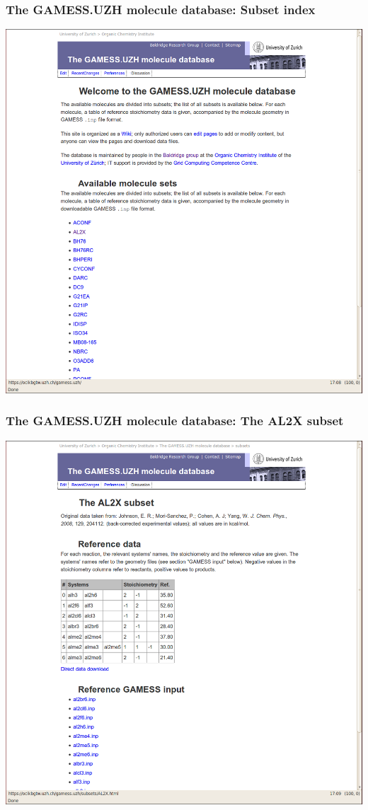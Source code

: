 \documentclass {beamer}
\begin{document}
\begin{frame}
  \frametitle{The GAMESS.UZH molecule database: Subset index}
  \begin{center}
    \includegraphics[height=0.9\textheight]{gamess-uzh-1}
  \end{center}
\end{frame}

\begin{frame}
  \frametitle{The GAMESS.UZH molecule database: The AL2X subset}
  \begin{center}
    \includegraphics[height=0.9\textheight]{gamess-uzh-2}
  \end{center}
\end{frame}
\end{document}
